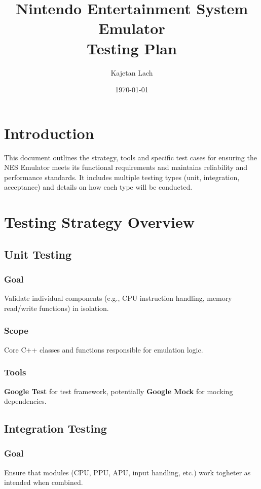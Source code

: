 \documentclass[a4paper, 11pt]{article}
\title{%
\textbf{Nintendo Entertainment System Emulator}\\
Testing Plan
}
\date{\today}
\author{Kajetan Lach}
\begin{document}
\maketitle

\section{Introduction}
This document outlines the strategy, tools and specific test cases for ensuring the NES Emulator meets its functional requirements and maintains reliability and performance standards. It includes multiple testing types (unit, integration, acceptance) and details on how each type will be conducted.

\section{Testing Strategy Overview}

\subsection{Unit Testing}

\subsubsection{Goal}
Validate individual components (e.g., CPU instruction handling, memory read/write functions) in isolation.

\subsubsection{Scope}
Core C++ classes and functions responsible for emulation logic.

\subsubsection{Tools}
\textbf{Google Test} for test framework, potentially \textbf{Google Mock} for mocking dependencies.

\subsection{Integration Testing}

\subsubsection{Goal}
Ensure that modules (CPU, PPU, APU, input handling, etc.) work togheter as intended when combined.
\end{document}
